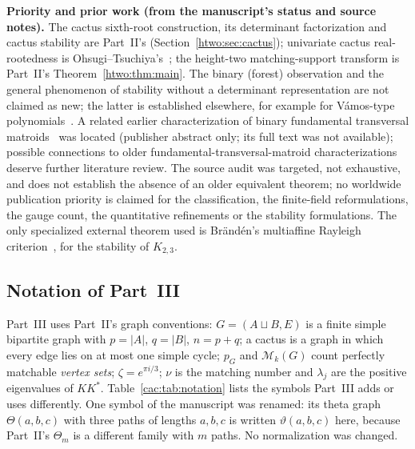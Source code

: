 \documentclass[11pt]{article}
\numberwithin{equation}{section}
\theoremstyle{definition}
\newcommand{\PM}{\mathcal M}
\begin{document}
\begin{statusbox}
\small\textbf{Priority and prior work (from the manuscript's status and
source notes).} The cactus sixth-root construction, its determinant
factorization and cactus stability are Part~II's
(Section~\ref{htwo:sec:cactus}); univariate cactus real-rootedness is
Ohsugi--Tsuchiya's~\cite[Theorem~7.2]{OT21}; the height-two
matching-support transform is Part~II's Theorem~\ref{htwo:thm:main}. The
binary (forest) observation and the general phenomenon of stability without
a determinant representation are not claimed as new; the latter is
established elsewhere, for example for V\'amos-type
polynomials~\cite{BVY}. A related earlier characterization of binary
fundamental transversal matroids~\cite{Nakamura} was located (publisher
abstract only; its full text was not available); possible connections to
older fundamental-transversal-matroid characterizations deserve further
literature review. The source audit was targeted, not exhaustive, and does
not establish the absence of an older equivalent theorem; no worldwide
publication priority is claimed for the classification, the finite-field
reformulations, the gauge count, the quantitative refinements or the
stability formulations. The only specialized external theorem used is
Br\"and\'en's multiaffine Rayleigh criterion~\cite[Theorem~5.6]{Branden},
for the stability of $K_{2,3}$.
\end{statusbox}

\subsection{Notation of Part~III}
\label{cac:sec:notation}
Part~III uses Part~II's graph conventions: $G=(A\sqcup B,E)$ is a finite
simple bipartite graph with $p=|A|$, $q=|B|$, $n=p+q$; a cactus is a graph in
which every edge lies on at most one simple cycle; $p_G$ and $\PM_k(G)$ count
perfectly matchable \emph{vertex sets}; $\zeta=e^{\pi i/3}$; $\nu$ is the
matching number and $\lambda_j$ are the positive eigenvalues of $KK^*$.
Table~\ref{cac:tab:notation} lists the symbols Part~III adds or uses
differently. One symbol of the manuscript was renamed: its theta graph
$\Theta(a,b,c)$ with three paths of lengths $a,b,c$ is written
$\vartheta(a,b,c)$ here, because Part~II's $\Theta_m$ is a different family
with $m$ paths. No normalization was changed.
\end{document}
